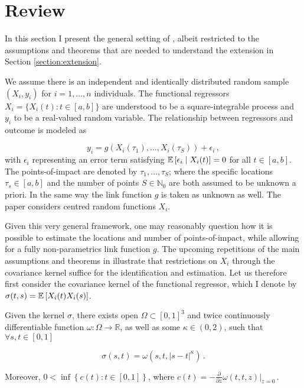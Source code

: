\section{Review}
\label{section:review}

In this section I present the general setting of \cite{Kneip2020}, albeit restricted to
the assumptions and theorems that are needed to understand the extension in Section
\ref{section:extension}.

We assume there is an independent and identically distributed random sample $(X_i, y_i)$
for $i=1,\dots,n$ individuals. The functional regressors $X_i = \{ X_i(t) : t \in [a, b]
\}$ are understood to be a square-integrable process and $y_i$ to be a real-valued
random variable. The relationship between regressors and outcome is modeled as

\[
    y_i = g \left( X_i(\tau_1), \dots, X_i(\tau_S) \right) + \epsilon_i \,,
\]
with $\epsilon_i$ representing an error term satisfying $\mathbb{E}\left[\epsilon_i \mid
X_i(t)\right] = 0$ for all $t \in [a, b]$. The points-of-impact are denoted by $\tau_1, \dots,
\tau_S$; where the specific locations $\tau_s \in [a, b]$ and the number of points $S
\in \mathbb{N}_0$ are both assumed to be unknown a priori. In the same way the link
function $g$ is taken as unknown as well. The paper considers centred random functions
$X_i$.

Given this very general framework, one may reasonably question how it is possible to
estimate the locations and number of points-of-impact, while allowing for a fully
non-parametrics link function $g$. The upcoming repetitions of the main assumptions and
theorems in \cite{Kneip2020} illustrate that restrictions on $X_i$ through the
covariance kernel suffice for the identification and estimation. Let us therefore first
consider the covariance kernel of the functional regressor, which I denote by $\sigma(t,
s) = \mathbb{E}\left[X_i(t) X_i(s)\right]$.


\begin{assumption}
    Given the kernel $\sigma$, there exists open $\Omega \subset [0, 1]^3$ and twice
    continuously differentiable function $\omega : \Omega \to \mathbb{R}$, as well as
    some $\kappa \in (0, 2)$, such that $\forall s, t \in [0, 1]$

    \[
        \sigma(s, t) = \omega(s, t, |s-t|^{\kappa}) \,.
    \]

    Moreover, $0 < \inf \left\{ c(t) : t \in [0, 1] \right\}$, where $c(t) =
    -\frac{\partial}{\partial z} \omega(t, t, z)|_{z = 0} \,.$
\label{assumption:1}
\end{assumption}

